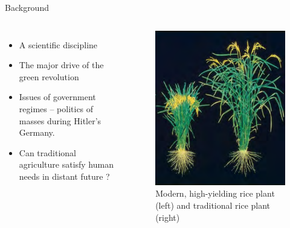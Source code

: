 \documentclass[11pt,ignorenonframetext,aspectratio=169]{beamer}
\providecommand{\tightlist}{%
  \setlength{\itemsep}{0pt}\setlength{\parskip}{0pt}}
\newcommand{\bcolumns}{\begin{columns}[T, onlytextwidth]}
\newcommand{\ecolumns}{\end{columns}}
\begin{document}
\begin{frame}{Background}
\protect\hypertarget{background}{}
\bcolumns
{}

\begin{itemize}[<+->]
\tightlist
\item
  A scientific discipline
\item
  The major drive of the green revolution
\item
  Issues of government regimes -- politics of masses during Hitler's
  Germany.
\item
  Can traditional agriculture satisfy human needs in distant future ?
\end{itemize}


\begin{figure}
\includegraphics[width=0.8\linewidth]{../images/green_revolution_crop} \caption{Modern, high-yielding rice plant (left) and traditional rice plant (right)}\label{fig:green-revolution-crop}
\end{figure}

\ecolumns
\end{frame}
\end{document}
